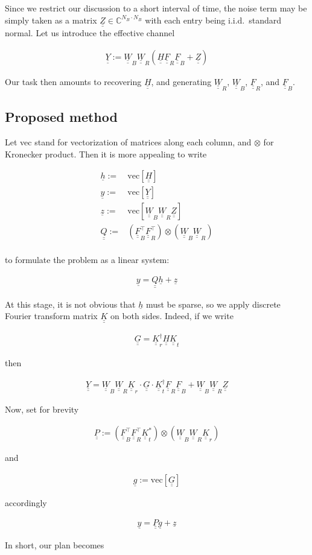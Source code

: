 \documentclass[journal]{IEEEtran}
\newcommand {\D} {\cdot}
\newcommand {\Tr} {\intercal}
\newcommand {\m} [1] {\( #1 \)}
\newcommand {\V} [1] {\underline {#1}}
\newcommand {\M} [1] {\underline {\underline {#1}}}
\newcommand {\RB} [1] {\left( #1 \right)}
\newcommand {\SB} [1] {\left[ #1 \right]}
\newcommand {\Disp} [1] {
   \begin {align*}
      #1
   \end {align*}
}
\begin{document}
Since we restrict our discussion to a short interval of time, the noise term may be simply taken as a matrix \m {\M {Z} \in \mathbb {C} ^{N_B \D N_B}} with each entry being i.i.d.\ standard normal.
Let us introduce the effective channel
%
\Disp {
\M {Y}
:=\M {W} _B \M {W} _R \RB {\M {H} \M {F} _R \M {F} _B +\M {Z}} 
}
%
Our task then amounts to recovering \m {\M {H}}, and generating \m {\M {W} _R}, \m {\M {W} _B}, \m {\M {F} _R}, and \m {\M {F} _B}.

\subsection{Proposed method}

Let vec stand for vectorization of matrices along each column, and \m {\otimes} for Kronecker product.
Then it is more appealing to write
\Disp {
\V {h}
:= &\mathrm {vec} \SB {\M {H}} \\
\V {y}
:= &\mathrm {vec} \SB {\M {Y}} \\
\V {z}
:= &\mathrm {vec} \SB {\M {W} _B \M {W} _R \M {Z}} \\
\M {Q}
:= &\RB {\M {F} _B^\intercal \M {F} _R^\Tr} \otimes \RB {\M {W} _B \M {W} _R} \\
}
to formulate the problem as a linear system:
\Disp {
\V {y}
=\M {Q} \V {h} +\V {z} 
}

At this stage, it is not obvious that \m {\V {h}} must be sparse, so we apply discrete Fourier transform matrix \m {\M {K}} on both sides.
Indeed, if we write
\Disp {
\M {G}
=\M {K}^\dagger _r \M {H} \M {K} _t
}
then
\Disp {
\M {Y}
=\M {W} _B \M {W} _R \M {K} _r \D \M {G} \D \M {K}^\dagger _t \M {F} _R \M {F} _B
+\M {W} _B \M {W} _R \M {Z}
}
Now, set for brevity
\Disp {
\M {P}
:=\RB {\M {F} _B^\intercal \M {F} _R^\intercal \M {K}^\ast _t} \otimes \RB {\M {W} _B \M {W} _R \M {K} _r}
}
and
\Disp {
\V {g}
:= \mathrm {vec} \SB {\M {G}}
}
accordingly
\Disp {
\V {y}
=\M {P} \V {g} +\V {z} 
}

In short, our plan becomes
\end{document}
